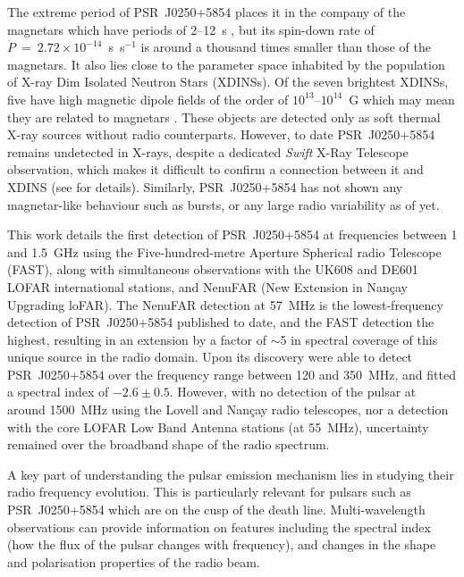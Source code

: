 The extreme period of PSR~J0250+5854 places it in the company of the magnetars which have periods of 2--12~s \citep{OKxx2014}, but its spin-down rate of $\dot{P}~=~2.72\times10^{-14}$~s~s$^{-1}$ is around a thousand times smaller than those of the magnetars.  It also lies close to the parameter space inhabited by the population of X-ray Dim Isolated Neutron Stars (XDINSs). Of the seven brightest XDINSs, five have high magnetic dipole fields of the order of $10^{13}$--$10^{14}$~G which may mean they are related to magnetars \citep[][see Sec~\ref{sec: intro - general intro - pulsar population}]{Hxxx2007, KKxx2007}. These objects are detected only as soft thermal X-ray sources without radio counterparts. However, to date PSR~J0250+5854 remains undetected in X-rays, despite a dedicated \textit{Swift} X-Ray Telescope observation, which makes it difficult to confirm a connection between it and XDINS (see \citealt{TBC+2018} for details). Similarly, PSR~J0250+5854 has not shown any magnetar-like behaviour such as bursts, or any large radio variability as of yet.


This work details the first detection of PSR~J0250+5854 at frequencies between 1 and 1.5~GHz using the Five-hundred-metre Aperture Spherical radio Telescope (FAST), along with simultaneous observations with the UK608 and DE601 LOFAR international stations, and NenuFAR (New Extension in Nan\c{c}ay Upgrading loFAR). The NenuFAR detection at 57~MHz is the lowest-frequency detection of PSR~J0250+5854 published to date, and the FAST detection the highest, resulting in an extension by a factor of $\sim$5 in spectral coverage of this unique source in the radio domain. Upon its discovery \citet{TBC+2018} were able to detect PSR~J0250+5854 over the frequency range between 120 and 350~MHz, and fitted a spectral index of $-2.6\pm0.5$. However, with no detection of the pulsar at around 1500~MHz using the Lovell and Nan\c{c}ay radio telescopes, nor a detection with the core LOFAR Low Band Antenna stations (at 55~MHz), uncertainty remained over the broadband shape of the radio spectrum. 


A key part of understanding the pulsar emission mechanism lies in studying their radio frequency evolution. This is particularly relevant for pulsars such as PSR~J0250+5854 which are on the cusp of the death line. Multi-wavelength observations can provide information on features including the spectral index (how the flux of the pulsar changes with frequency), and changes in the shape and polarisation properties of the radio beam.

